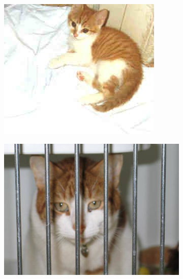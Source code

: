 \begin{figure}
\begin{subfigure}[b]{.2\linewidth}
\includegraphics[width=\linewidth]{Figs/cat1412.jpg}
\end{subfigure}
\begin{subfigure}[b]{.2\linewidth}
\includegraphics[width=\linewidth]{Figs/cat1168.jpg}
\end{subfigure}


\end{figure}
